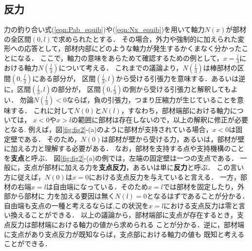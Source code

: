 \documentclass[10pt,a4j]{jbook}
\begin{document}
\subsection{反力}
力の釣り合い式(\ref{eqn:Pab_equib})や(\ref{eqn:Nx_equib})を用いて軸力$N(x)$が部材の全区間$(0,l)$で求められたとする．
その場合，外力や強制的に加えられた変形への応答として，部材内部にどのような軸力が発生するかくまなく分かったことになる．
ここで，軸力の意味をあらためて確認するための例として，$x=\frac{l}{3}$における軸力$N(\frac{l}{3})$について考える．
これまでの議論より，$N(\frac{l}{3})$は棒部材の区間$(0,\frac{l}{3})$にある部分が，
区間$(\frac{l}{3},l)$から受ける引張力を意味する．あるいは逆に，区間$(\frac{l}{3},l)$の部分が，
区間$(0,\frac{l}{3})$の側から受ける引張力と解釈してもよい．
勿論$N(\frac{l}{3})<0$ならば，負の引張力，つまり圧縮力が生じていることを意味する．
これに対して$N(0)$と$N(l)$，すなわち，部材端部における軸力については，
$x<0$や$x>l$の範囲に部材は存在しないので，以上の解釈に修正が必要となる.
例えば，図\ref{fig:fig2}-(a)のように部材が支持されている場合，$x<0$は固定壁である．
そのため，$N(0)$は部材が壁から受ける力，あるいは，部材が壁に加える力と理解する必要がある．
なお，部材を支持する点や支持機構のことを{\rm \bf 支点}と呼ぶ．
図\ref{fig:fig2}-(a)の例では，左端の固定壁は一つの支点である．
一般に，支点が部材に加える力を{\bf 支点反力}，あるいは単に{\bf 反力}と呼ぶ．
この言い方に従えば，$N(0)$は$x=0$における支点反力を与えていると言える．
一方，部材の右端$x=l$は自由端になっている．そのため$x=l$では部材を固定したり，外部から部材に
力を加える要因は無く$N(l)=0$となるはずであることが分かる．
自由端も支点の一種と考えるならば,この状況を$x=l$における支点反力は零と言い換えることができる．
以上の議論から，部材端部に支点が存在するとき，支点反力は部材端における軸力の値から求められる
ことが分かる．逆に，部材端に支点があり支点反力が既知ならば，支点部における軸力の値も
既知と考えることができる．
\end{document}
